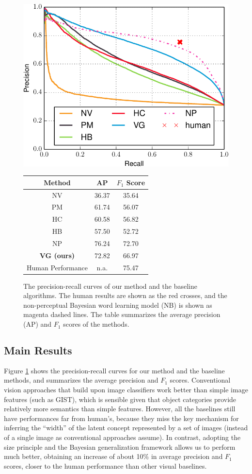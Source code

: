 \begin{figure}
  \centering
  \includegraphics[width=0.5\linewidth]{figs/vcl/pr_curve.pdf}

  \begin{tabular}{c|cc}
      \hline\hline
      Method & AP & $F_1$ Score \\
      \hline
      NV & 36.37 & 35.64 \\
      PM & 61.74 & 56.07 \\
      HC & 60.58 & 56.82 \\
      HB & 57.50 & 52.72 \\
      NP & 76.24 & 72.70 \\
      {\bfseries VG (ours)} & 72.82 & 66.97 \\
      \hline
      Human Performance & n.a. & 75.47 \\
      \hline
  \end{tabular}
  \caption{The precision-recall curves of our method and the baseline algorithms. The human results are shown as the red crosses, and the non-perceptual Bayesian word learning model (NB) is shown as magenta dashed lines. The table summarizes the average precision (AP) and $F_1$ scores of the methods.}\label{fig:prcurve}
\end{figure}


\subsection{Main Results}
Figure \ref{fig:prcurve} shows the precision-recall curves for our method and the baseline methods, and summarizes the average precision and $F_1$ scores. Conventional vision approaches that build upon image classifiers work better than simple image features (such as GIST), which is sensible given that object categories provide relatively more semantics than simple features. However, all the baselines still have performances far from human's, because they miss the key mechanism for inferring the ``width'' of the latent concept represented by a set of images (instead of a single image as conventional approaches assume). In contrast, adopting the size principle and the Bayesian generalization framework allows us to perform much better, obtaining an increase of about 10\% in average precision and $F_1$ scores, closer to the human performance than other visual baselines.


